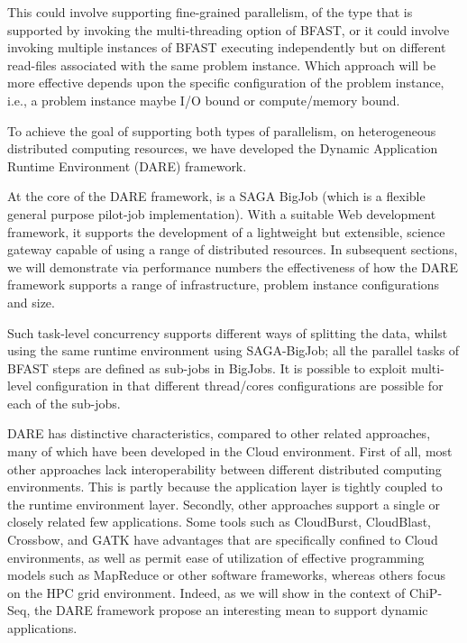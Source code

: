 \documentclass{cpeauth}
\begin{document}
This could involve supporting fine-grained parallelism, of the type
that is supported by invoking the multi-threading option of BFAST, or
it could involve invoking multiple instances of BFAST executing
independently but on different read-files associated with the same
problem instance. Which approach will be more effective depends upon
the specific configuration of the problem instance, i.e., a problem
instance maybe I/O bound or compute/memory bound.

To achieve the goal of supporting both types of parallelism, on
heterogeneous distributed computing resources, we have developed the
Dynamic Application Runtime Environment (DARE)
framework\cite{dareurl,dare-tg11,dare-ecmls11}.

At the core of the DARE framework, is a SAGA BigJob (which is a
flexible general purpose pilot-job
implementation)\cite{saga-ccgrid10,saga-royalsoc,saga-web,jha2009developing,ecmls10}.
With a suitable Web development framework, it supports the development
of a lightweight but extensible, science gateway capable of using a
range of distributed resources.  In subsequent sections, we will
demonstrate via performance numbers the effectiveness of how the DARE
framework supports a range of infrastructure, problem instance
configurations and size.

Such task-level concurrency supports different ways of splitting the
data, whilst using the same runtime environment using SAGA-BigJob; all
the parallel tasks of BFAST steps are defined as sub-jobs in BigJobs.
It is possible to exploit multi-level configuration in that different
thread/cores configurations are possible for each of the sub-jobs.

DARE has distinctive characteristics, compared to other related
approaches\cite{taylor2010,cloudburst, cloudblast,
  langmead2009,langmead2010,gatk,halligan2009,luyf-2010}, many of
which have been developed in the Cloud environment.  First of all,
most other approaches lack interoperability between different
distributed computing environments.  This is partly because the
application layer is tightly coupled to the runtime environment layer.
Secondly, other approaches support a single or closely related few
applications.  Some tools such as CloudBurst\cite{cloudburst},
CloudBlast\cite{cloudblast}, Crossbow\cite{langmead2009}, and
GATK\cite{gatk} have advantages that are specifically confined to
Cloud environments, as well as permit ease of utilization of effective
programming models such as MapReduce or other software frameworks,
whereas others\cite{luyf-2010} focus on the HPC grid environment.
Indeed, as we will show in the context of ChiP-Seq, the DARE framework
propose an interesting mean to support dynamic applications.
\end{document}
